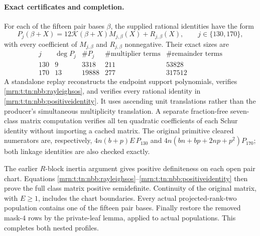\documentclass[11pt,a4paper]{article}
\theoremstyle{remark}\newtheorem{remark}[theorem]{Remark}
\begin{document}
\paragraph{Exact certificates and completion.}
For each of the fifteen pair bases $\beta$, the supplied rational identities
have the form
\begin{equation}\label{mrn:t:tn:nbb:positiveidentity}
 P_j(\beta+X)=12\mathcal K(\beta+X)M_{j,\beta}(X)+R_{j,\beta}(X),
 \qquad j\in\{130,170\},
\end{equation}
with every coefficient of $M_{j,\beta}$ and $R_{j,\beta}$ nonnegative.
Their exact sizes are
\[
\begin{array}{c|r|r|r|r}
 j&\deg P_j&\#P_j&\#\text{multiplier terms}&\#\text{remainder terms}\\\hline
 130&9&3318&211&53828\\
 170&13&19888&277&317512
\end{array}
\]
A standalone replay reconstructs the endpoint support polynomials,
verifies \eqref{mrn:t:tn:nbb:rayleighsos}, and verifies every rational identity in
\eqref{mrn:t:tn:nbb:positiveidentity}. It uses ascending unit translations rather
than the producer's simultaneous multiplicity translation. A separate
fraction-free seven-class matrix computation verifies all ten quadratic
coefficients of each Schur identity without importing a cached matrix.
The original primitive cleared numerators are, respectively,
$4n(b+p)E\,P_{130}$ and $4n(bn+bp+2np+p^2)P_{170}$; both linkage identities
are also checked exactly.

The earlier $R$-block inertia argument gives positive definiteness on each
open pair chart. Equations \eqref{mrn:t:tn:nbb:rayleighsos}--\eqref{mrn:t:tn:nbb:positiveidentity}
then prove the full class matrix positive semidefinite. Continuity of the
original matrix, with $E\ge1$, includes the chart boundaries. Every actual
projected-rank-two population contains one of the fifteen pair bases.
Finally restore the removed mask-$4$ rows by the private-leaf lemma,
applied to actual populations. This completes both nested profiles.
\end{document}
